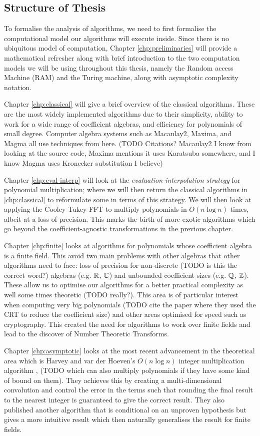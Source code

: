 \subsection{Structure of Thesis}
\label{sub:Structure-of-Thesis}

To formalise the analysis of algorithms, we need to first formalise the computational model our algorithms will execute inside. Since there is no ubiquitous model of computation, Chapter \ref{chp:preliminaries} will provide a mathematical refresher along with brief introduction to the two computation models we will be using throughout this thesis, namely the Random access Machine (RAM) and the Turing machine, along with asymptotic complexity notation.

Chapter \ref{chp:classical} will give a brief overview of the classical algorithms. These are the most widely implemented algorithms due to their simplicity, ability to work for a wide range of coefficient algebras, and efficiency for polynomials of small degree. Computer algebra systems such as Macaulay2, Maxima, and Magma all use techniques from here. (TODO Citations? Macaulay2 I know from looking at the source code, Maxima mentions it uses Karatsuba somewhere, and I know Magma uses Kronecker substitution I believe)

Chapter \ref{chp:eval-interp} will look at the \emph{evaluation-interpolation strategy} for polynomial multiplication; where we will then return the classical algorithms in \ref{chp:classical} to reformulate some in terms of this strategy. We will then look at applying the Cooley-Tukey FFT to multiply polynomials in $O(n \log n)$ times, albeit at a loss of precision. This marks the birth of more exotic algorithms which go beyond the coefficient-agnostic transformations in the previous chapter. 

Chapter \ref{chp:finite} looks at algorithms for polynomials whose coefficient algebra is a finite field. This avoid two main problems with other algebras that other algorithms need to face: loss of precision for non-discrete (TODO is this the correct word?) algebras (e.g. ${\mathbb R}$, ${\mathbb C}$) and unbounded coefficient sizes (e.g. ${\mathbb Q}$, ${\mathbb Z}$). These allow us to optimise our algorithms for a better practical complexity as well some times theoretic (TODO really?). This area is of particular interest when computing very big polynomials (TODO cite the paper where they used the CRT to reduce the coefficient size) and other areas optimised for speed such as cryptography. This created the need for algorithms to work over finite fields and lead to the discover of Number Theoretic Transforms. 

Chapter \ref{chp:asymptotic} looks at the most recent advancement in the theoretical area which is Harvey and var der Hoeven's $O(n \log n)$ integer multiplication algorithm \cite{nlogn}, (TODO which can also multiply polynomials if they have some kind of bound on them). They achieves this by creating a multi-dimensional convolution and control the error in the terms such that rounding the final result to the nearest integer is guaranteed to give the correct result. They also published another algorithm that is conditional on an unproven hypothesis but gives a more intuitive result which then naturally generalises the result for finite fields. 

